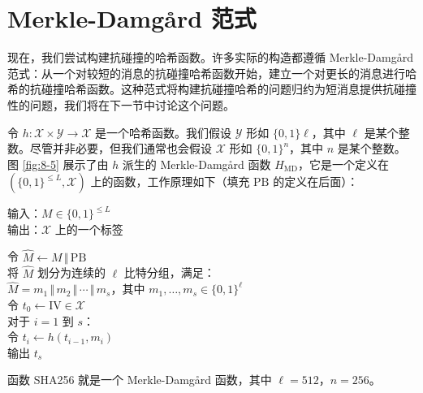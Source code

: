 \section{Merkle-Damg{\aa}rd 范式}\label{sec:8-4}

现在，我们尝试构建抗碰撞的哈希函数。许多实际的构造都遵循 Merkle-Damg{\aa}rd 范式：从一个对较短的消息的抗碰撞哈希函数开始，建立一个对更长的消息进行哈希的抗碰撞哈希函数。这种范式将构建抗碰撞哈希的问题归约为短消息提供抗碰撞性的问题，我们将在下一节中讨论这个问题。

令 $h:\mathcal{X}\times\mathcal{Y}\to\mathcal{X}$ 是一个哈希函数。我们假设 $\mathcal{Y}$ 形如 $\{0,1\}\ell$，其中 $\ell$ 是某个整数。尽管并非必要，但我们通常也会假设 $\mathcal{X}$ 形如 $\{0,1\}^n$，其中 $n$ 是某个整数。图 \ref{fig:8-5} 展示了由 $h$ 派生的 Merkle-Damg{\aa}rd 函数 $H_\mathrm{MD}$，它是一个定义在 $(\{0,1\}^{\leq L},\mathcal{X})$ 上的函数，工作原理如下（填充 $\mathrm{PB}$ 的定义在后面）：

\vspace{5pt}

\hspace*{5pt} 输入：$M\in\{0,1\}^{\leq L}$\\
\hspace*{26pt} 输出：$\mathcal{X}$ 上的一个标签

\vspace{5pt}

\hspace*{5pt} 令 $\hat{M}\leftarrow M\,\Vert\,\mathrm{PB}$\\
\hspace*{26pt} 将 $\hat{M}$ 划分为连续的 $\ell$ 比特分组，满足：\\
\hspace*{50pt} $\hat{M}=m_1\,\Vert\,m_2\,\Vert\,\cdots\,\Vert\,m_s$，其中 $m_1,\dots,m_s\in\{0,1\}^\ell$\\
\hspace*{26pt} 令 $t_0\leftarrow\mathrm{IV}\in\mathcal{X}$\\
\hspace*{26pt} 对于 $i=1$ 到 $s$：\\
\hspace*{50pt} 令 $t_i\leftarrow h(t_{i-1},m_i)$\\
\hspace*{26pt} 输出 $t_s$

\vspace{5pt}

\noindent
函数 SHA256 就是一个 Merkle-Damg{\aa}rd 函数，其中 $\ell=512$，$n=256$。


